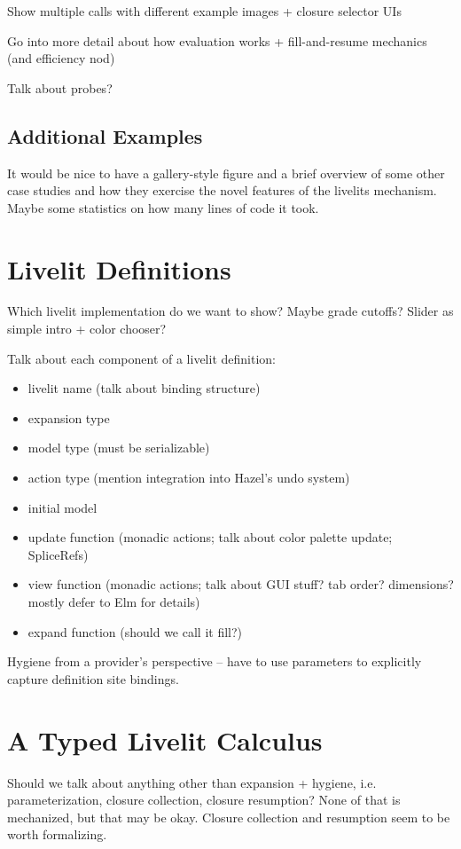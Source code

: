 Show multiple calls with different example images + closure selector UIs

Go into more detail about how evaluation works + fill-and-resume mechanics (and efficiency nod)

Talk about probes?

\subsection{Additional Examples}
It would be nice to have a gallery-style figure and a brief overview of some other case studies
and how they exercise the novel features of the livelits mechanism. Maybe some statistics on how
many lines of code it took.

\section{Livelit Definitions}
Which livelit implementation do we want to show? Maybe grade cutoffs? Slider as simple intro + color chooser?

Talk about each component of a livelit definition:
\begin{itemize}
  \item livelit name (talk about binding structure)
  \item expansion type
  \item model type (must be serializable)
  \item action type (mention integration into Hazel's undo system)
  \item initial model
  \item update function (monadic actions; talk about color palette update; SpliceRefs)
  \item view function (monadic actions; talk about GUI stuff? tab order? dimensions? mostly defer to Elm for details)
  \item expand function (should we call it fill?)
\end{itemize}

Hygiene from a provider's perspective -- have to use parameters to explicitly capture definition site bindings.


\section{A Typed Livelit Calculus}
Should we talk about anything other than expansion + hygiene, i.e. parameterization, closure collection, closure resumption?
None of that is mechanized, but that may be okay. Closure collection and resumption seem to be worth formalizing.

